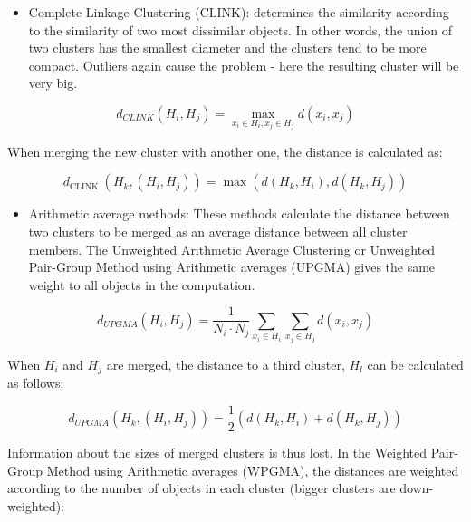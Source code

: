 \documentclass[10pt]{book}
\begin{document}
\begin{itemize}
  \item Complete Linkage Clustering (CLINK): determines the similarity according to the similarity of two most dissimilar objects. In other words, the union of two clusters has the smallest diameter and the clusters tend to be more compact. Outliers again cause the problem - here the resulting cluster will be very big.
\end{itemize}


\begin{equation*}
d_{C L I N K}\left(H_{i}, H_{j}\right)=\max _{x_{i} \in H_{i}, x_{j} \in H_{j}} d\left(x_{i}, x_{j}\right) \tag{12.27}
\end{equation*}


When merging the new cluster with another one, the distance is calculated as:


\begin{equation*}
d_{\text {CLINK }}\left(H_{k},\left(H_{i}, H_{j}\right)\right)=\max \left(d\left(H_{k}, H_{i}\right), d\left(H_{k}, H_{j}\right)\right) \tag{12.28}
\end{equation*}


\begin{itemize}
  \item Arithmetic average methods: These methods calculate the distance between two clusters to be merged as an average distance between all cluster members. The Unweighted Arithmetic Average Clustering or Unweighted Pair-Group Method using Arithmetic averages (UPGMA) gives the same weight to all objects in the computation.
\end{itemize}


\begin{equation*}
d_{U P G M A}\left(H_{i}, H_{j}\right)=\frac{1}{N_{i} \cdot N_{j}} \sum_{x_{i} \in H_{i}} \sum_{x_{j} \in H_{j}} d\left(x_{i}, x_{j}\right) \tag{12.29}
\end{equation*}


When $H_{i}$ and $H_{j}$ are merged, the distance to a third cluster, $H_{l}$ can be calculated as follows:


\begin{equation*}
d_{U P G M A}\left(H_{k},\left(H_{i}, H_{j}\right)\right)=\frac{1}{2}\left(d\left(H_{k}, H_{i}\right)+d\left(H_{k}, H_{j}\right)\right) \tag{12.30}
\end{equation*}


Information about the sizes of merged clusters is thus lost. In the Weighted Pair-Group Method using Arithmetic averages (WPGMA), the distances are weighted according to the number of objects in each cluster (bigger clusters are down-weighted):
\end{document}
